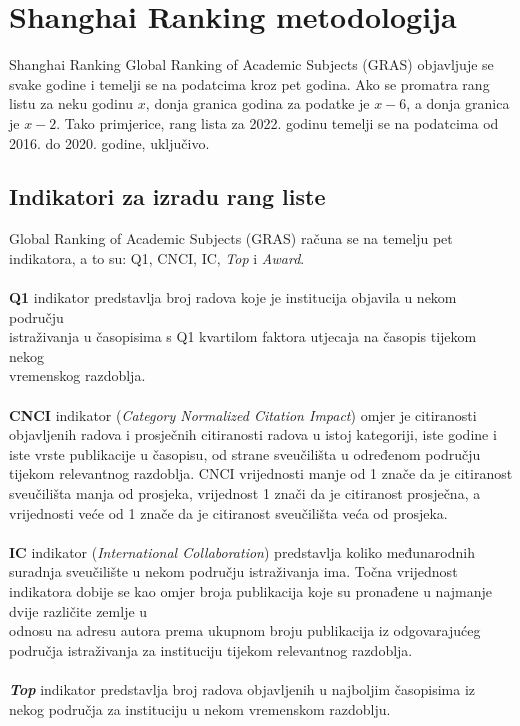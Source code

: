 \documentclass[times, utf8, zavrsni]{fer}
\begin{document}
\chapter{Shanghai Ranking metodologija}
Shanghai Ranking Global Ranking of Academic Subjects (GRAS) objavljuje se svake godine i temelji se na podatcima kroz pet godina.
Ako  se promatra rang listu za neku godinu $x$,
donja granica godina za podatke je $x-6$, a donja granica je $x-2$. Tako primjerice, rang lista za 2022. godinu temelji se na podatcima od 2016. do 2020. godine, uključivo.

\section{Indikatori za izradu rang liste}
\label{indikatori}
Global Ranking of Academic Subjects (GRAS) računa se na temelju pet indikatora, a to su: Q1, CNCI, IC, \emph{Top} i \emph{Award}.
\\ \\\textbf{Q1} indikator predstavlja broj radova koje je institucija objavila u nekom području \\istraživanja 
u časopisima s Q1 kvartilom faktora utjecaja na časopis tijekom nekog \\vremenskog razdoblja.   
\\ \\\textbf{CNCI} indikator (\emph{Category Normalized Citation Impact}) omjer je citiranosti \\objavljenih radova i prosječnih citiranosti 
radova u istoj kategoriji, iste godine i iste vrste publikacije u časopisu, od strane sveučilišta u određenom području tijekom relevantnog razdoblja.
CNCI vrijednosti manje od 1 znače da je citiranost sveučilišta manja od prosjeka, vrijednost 1 znači da je citiranost prosječna, a vrijednosti veće od
1 znače da je citiranost sveučilišta veća od prosjeka.
\\ \\\textbf{IC} indikator (\emph{International Collaboration}) predstavlja koliko međunarodnih suradnja sveučilište u nekom području istraživanja ima.
Točna vrijednost indikatora dobije se kao omjer broja publikacija koje su pronađene u najmanje dvije različite zemlje 
u \\odnosu na adresu autora prema ukupnom broju publikacija iz odgovarajućeg područja istraživanja za instituciju tijekom relevantnog razdoblja.
\\ \\\textbf{\emph{Top}} indikator predstavlja broj radova objavljenih u najboljim časopisima iz nekog područja za instituciju u nekom vremenskom razdoblju. 
\end{document}
